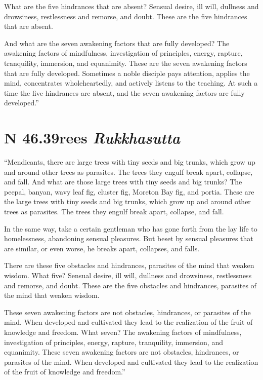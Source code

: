 \documentclass[12pt,openany]{book}%
\newcommand*{\suttatitleacronym}[1]{\smaller[2]{#1}\vspace*{.3em}}
\newcommand*{\suttatitletranslation}[1]{\linebreak{#1}}
\newcommand*{\suttatitleroot}[1]{\linebreak\smaller[2]\itshape{#1}}
\newcommand*{\tocacronym}[1]{\hspace*{-3.3em}{#1}\quad}
\newcommand*{\toctranslation}[1]{#1}
\newcommand*{\tocroot}[1]{(\textit{#1})}
\begin{document}
What are the five hindrances that are absent? Sensual desire, ill will, dullness and drowsiness, restlessness and remorse, and doubt. These are the five hindrances that are absent. 

And what are the seven awakening factors that are fully developed? The awakening factors of mindfulness, investigation of principles, energy, rapture, tranquility, immersion, and equanimity. These are the seven awakening factors that are fully developed. Sometimes a noble disciple pays attention, applies the mind, concentrates wholeheartedly, and actively listens to the teaching. At such a time the five hindrances are absent, and the seven awakening factors are fully developed.” 

%
\section*{{\suttatitleacronym SN 46.39}{\suttatitletranslation Trees }{\suttatitleroot Rukkhasutta}}
\addcontentsline{toc}{section}{\tocacronym{SN 46.39} \toctranslation{Trees } \tocroot{Rukkhasutta}}

“Mendicants, there are large trees with tiny seeds and big trunks, which grow up and around other trees as parasites. The trees they engulf break apart, collapse, and fall. And what are those large trees with tiny seeds and big trunks? The peepal, banyan, wavy leaf fig, cluster fig, Moreton Bay fig, and portia. These are the large trees with tiny seeds and big trunks, which grow up and around other trees as parasites. The trees they engulf break apart, collapse, and fall. 

In the same way, take a certain gentleman who has gone forth from the lay life to homelessness, abandoning sensual pleasures. But beset by sensual pleasures that are similar, or even worse, he breaks apart, collapses, and falls. 

There are these five obstacles and hindrances, parasites of the mind that weaken wisdom. What five? Sensual desire, ill will, dullness and drowsiness, restlessness and remorse, and doubt. These are the five obstacles and hindrances, parasites of the mind that weaken wisdom. 

These seven awakening factors are not obstacles, hindrances, or parasites of the mind. When developed and cultivated they lead to the realization of the fruit of knowledge and freedom. What seven? The awakening factors of mindfulness, investigation of principles, energy, rapture, tranquility, immersion, and equanimity. These seven awakening factors are not obstacles, hindrances, or parasites of the mind. When developed and cultivated they lead to the realization of the fruit of knowledge and freedom.” 
\end{document}

